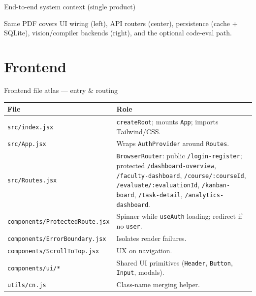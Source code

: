 \documentclass[aspectratio=169]{beamer}
\begin{document}
\begin{frame}{End-to-end system context (single product)}
  \centering

  \vspace{0.6em}
  \footnotesize
  Same PDF covers UI wiring (left), API routers (center), persistence (cache + SQLite), vision/compiler backends (right), and the optional code-eval path.
\end{frame}

\section{Frontend}

\begin{frame}{Frontend file atlas --- entry \& routing}
  \tiny
  \begin{tabular}{@{}p{5.0cm}p{8.8cm}@{}}
    \toprule
    File & Role \\
    \midrule
    \texttt{src/index.jsx} & \texttt{createRoot}; mounts \texttt{App}; imports Tailwind/CSS. \\
    \texttt{src/App.jsx} & Wraps \texttt{AuthProvider} around \texttt{Routes}. \\
    \texttt{src/Routes.jsx} & \texttt{BrowserRouter}: public \texttt{/login-register}; protected \texttt{/dashboard-overview}, \texttt{/faculty-dashboard}, \texttt{/course/:courseId}, \texttt{/evaluate/:evaluationId}, \texttt{/kanban-board}, \texttt{/task-detail}, \texttt{/analytics-dashboard}. \\
    \texttt{components/ProtectedRoute.jsx} & Spinner while \texttt{useAuth} loading; redirect if no \texttt{user}. \\
    \texttt{components/ErrorBoundary.jsx} & Isolates render failures. \\
    \texttt{components/ScrollToTop.jsx} & UX on navigation. \\
    \texttt{components/ui/*} & Shared UI primitives (\texttt{Header}, \texttt{Button}, \texttt{Input}, modals). \\
    \texttt{utils/cn.js} & Class-name merging helper. \\
    \bottomrule
  \end{tabular}
\end{frame}
\end{document}
